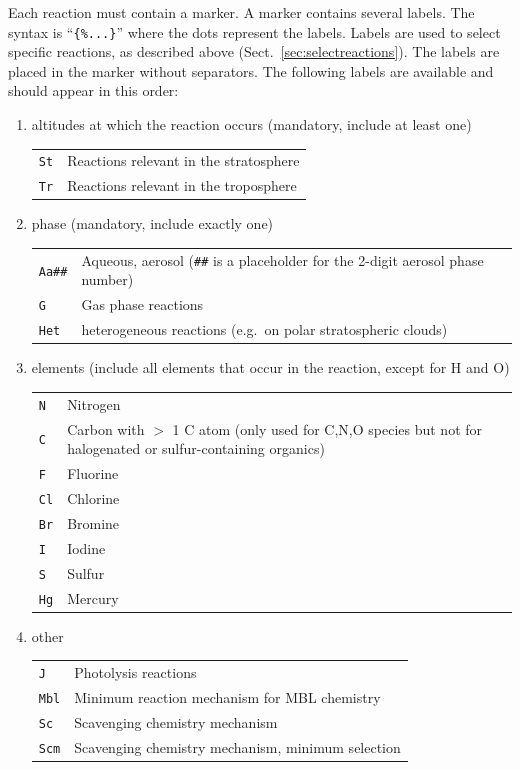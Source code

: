 \documentclass[twoside]{article}
\begin{document}
Each reaction must contain a marker. A marker contains several labels.
The syntax is ``\verb|{%...}|'' where the dots represent the
  labels. Labels are used to select specific reactions, as described
  above (Sect.~\ref{sec:selectreactions}). The labels are placed in the
  marker without separators. The following labels are available and
  should appear in this order:
\begin{enumerate}
\item altitudes at which the reaction occurs (mandatory, include at
  least one)\\
  \begin{tabular}{l@{ = }p{}}
  \verb|St|   & Reactions relevant in the stratosphere\\
  \verb|Tr|   & Reactions relevant in the troposphere
  \end{tabular}
\item phase (mandatory, include exactly one)\\
  \begin{tabular}{l@{ = }p{}}
    \verb|Aa##| & Aqueous, aerosol (\verb|##| is a placeholder for the
    2-digit aerosol phase number)\\
    \verb|G|    & Gas phase reactions\\
    \verb|Het|  & heterogeneous reactions (e.g.\ on polar stratospheric
                  clouds)\\ 
  \end{tabular}
\item elements (include all elements that occur in the reaction, except
  for H and O)\\
  \begin{tabular}{l@{ = }p{}}
  \verb|N|    & Nitrogen\\
  \verb|C|    & Carbon with $>$ 1 C atom (only used for C,N,O species but
                not for halogenated or sulfur-containing organics)\\
  \verb|F|    & Fluorine\\
  \verb|Cl|   & Chlorine\\
  \verb|Br|   & Bromine\\
  \verb|I|    & Iodine\\
  \verb|S|    & Sulfur\\
  \verb|Hg|   & Mercury
  \end{tabular}
\item other\\
  \begin{tabular}{l@{ = }p{}}
  \verb|J|    & Photolysis reactions\\
  \verb|Mbl|  & Minimum reaction mechanism for MBL chemistry\\
  \verb|Sc|   & Scavenging chemistry mechanism\\
  \verb|Scm|  & Scavenging chemistry mechanism, minimum selection
  \end{tabular}
\end{enumerate}
\end{document}
